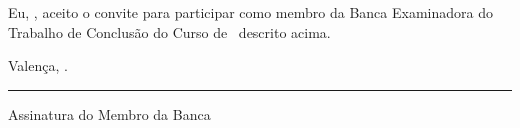 \vspace{3\baselineskip}
Eu, \cartaConviteProf, aceito o convite para participar como membro da Banca Examinadora do Trabalho de Conclusão do Curso de \course\ descrito acima.

\vspace{2\baselineskip}
\hfill Valença, \signDateCartaConvite.
\vspace{2.75\baselineskip}%
%
\begin{center}    
    \begin{minipage}[!h]{0.45\textwidth}
        \centering
        \rule{\textwidth}{0.4pt}\par
        Assinatura do Membro da Banca
    \end{minipage}
\end{center}
